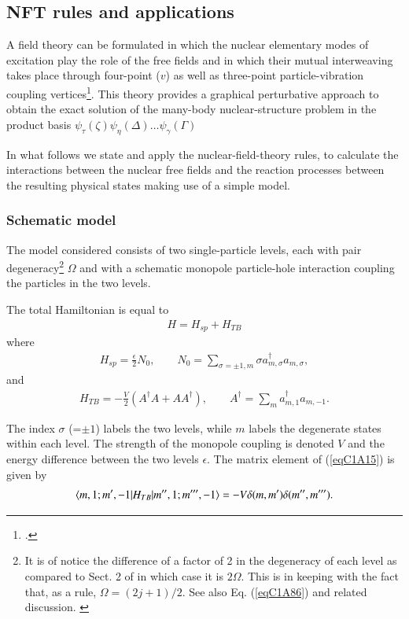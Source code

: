  
\subsection{NFT rules and applications}\label{Sect1.7.2}
A field theory can be formulated in which the nuclear elementary modes of
excitation play the role of the free fields and in which their mutual interweaving takes place through four-point ($v$) as well as three-point particle-vibration coupling vertices\footnote{\cite{Bes:74,Broglia:76,Bohr:75,Mottelson:76}.}.
This theory provides a graphical perturbative approach to obtain the exact
solution of the many-body nuclear-structure problem in the product basis $\psi_\tau(\zeta)\psi_\eta(\Delta)\dots\psi_\gamma(\Gamma)$




In what follows we state and apply the nuclear-field-theory rules, to calculate the interactions between the nuclear free fields and the reaction processes
between the resulting physical states making use of a simple model. \subsubsection{Schematic model}
The model considered consists of two single-particle levels, each with pair degeneracy\footnote{It is of notice the difference of a factor of 2 in the degeneracy of each level as compared to Sect. 2 of \cite{Bortignon:77} in which case it is $2\Omega$. This is in keeping with the fact that, as a rule, $\Omega=(2j+1)/2$. See also Eq. (\ref{eqC1A86}) and related discussion. \label{fnlabel}} $\Omega$ and with a schematic monopole particle-hole interaction coupling the particles in the two levels.

The total Hamiltonian is equal to
\begin{align}\label{eqC1A13} 
H=H_{sp}+H_{TB}
\end{align}
where
\begin{align}\label{eqC1A14} 
H_{sp}=\frac{\epsilon}{2}N_0,\quad\quad N_0=\sum_{\sigma=\pm 1,m}\sigma a^{\dagger}_{m,\sigma}a_{m,\sigma},
\end{align}
and
\begin{align}\label{eqC1A15} 
H_{TB}=-\frac{V}{2}\left(A^\dagger A+AA^\dagger\right),\quad\quad A^\dagger=\sum_m a^\dagger_{m,1}a_{m,-1}.
\end{align}


The index $\sigma$ (=$\pm1$) labels the two levels, while $m$ labels the degenerate states within
each level. The strength of the monopole coupling is denoted  $V$ and the
energy difference between the two levels  $\epsilon$. 
The matrix element of (\ref{eqC1A15}) is given by
\begin{align}\label{eqC1A16} 
\langle {m,1;m',-1|H_{TB}|m'',1;m''',-1} \rangle=-V\delta(m,m')\delta(m'',m''').
\end{align}
